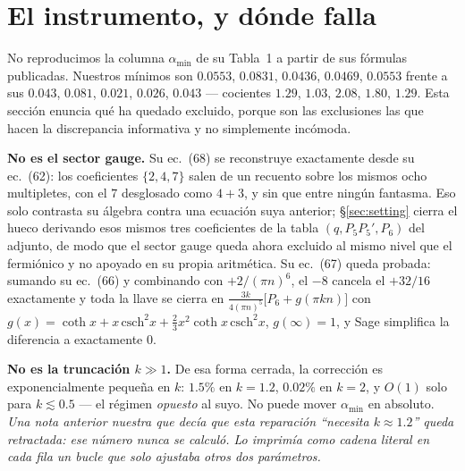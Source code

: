 \documentclass[11pt,a4paper]{article}
\newcommand{\amin}{\alpha_{\min}}
\begin{document}
\section{El instrumento, y dónde falla}\label{sec:instrument}

No reproducimos la columna $\amin$ de su Tabla~1 a partir de sus fórmulas publicadas. Nuestros
mínimos son $0.0553$, $0.0831$, $0.0436$, $0.0469$, $0.0553$ frente a sus $0.043$, $0.081$, $0.021$,
$0.026$, $0.043$ --- cocientes $1.29$, $1.03$, $2.08$, $1.80$, $1.29$. Esta sección enuncia qué ha
quedado excluido, porque son las exclusiones las que hacen la discrepancia informativa y no
simplemente incómoda.

\textbf{No es el sector gauge.} Su ec.~(68) se reconstruye exactamente desde su ec.~(62): los
coeficientes $\{2,4,7\}$ salen de un recuento sobre los mismos ocho multipletes, con el $7$ desglosado
como $4+3$, y sin que entre ningún fantasma. Eso solo contrasta su álgebra contra una ecuación suya
anterior; \S\ref{sec:setting} cierra el hueco derivando esos mismos tres coeficientes de la tabla
$(q,P_5P_5',P_6)$ del adjunto, de modo que el sector gauge queda ahora excluido al mismo nivel que el
fermiónico y no apoyado en su propia aritmética. Su ec.~(67) queda probada: sumando su ec.~(66) y
combinando con $+2/(\pi n)^6$, el $-8$ cancela el $+32/16$ exactamente y toda la llave se cierra en
$\tfrac{3k}{4(\pi n)^5}\big[P_6+g(\pi kn)\big]$ con
$g(x)=\coth x+x\,\mathrm{csch}^2x+\tfrac23x^2\coth x\,\mathrm{csch}^2x$, $g(\infty)=1$, y Sage
simplifica la diferencia a exactamente $0$.

\textbf{No es la truncación $k\gg1$.} De esa forma cerrada, la corrección es exponencialmente pequeña
en $k$: $1.5\%$ en $k=1.2$, $0.02\%$ en $k=2$, y $O(1)$ solo para $k\lesssim0.5$ --- el régimen
\emph{opuesto} al suyo. No puede mover $\amin$ en absoluto. \emph{Una nota anterior nuestra que decía
que esta reparación ``necesita $k\approx1.2$'' queda retractada: ese número nunca se calculó. Lo
imprimía como cadena literal en cada fila un bucle que solo ajustaba otros dos parámetros.}
\end{document}
